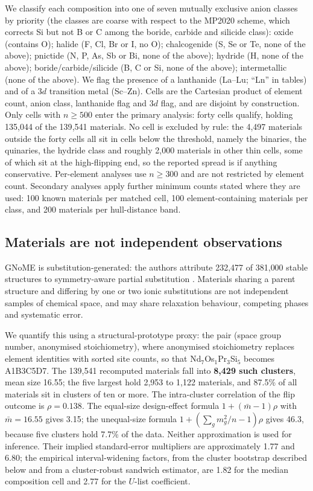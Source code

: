 \documentclass[11pt]{article}
\begin{document}
We classify each composition into one of seven mutually exclusive anion classes by
priority (the classes are coarse with respect to the MP2020 scheme, which corrects Si
but not B or C among the boride, carbide and silicide class): oxide (contains O); halide (F, Cl, Br or I, no O); chalcogenide (S, Se or Te,
none of the above); pnictide (N, P, As, Sb or Bi, none of the above); hydride (H, none of
the above); boride/carbide/silicide (B, C or Si, none of the above); intermetallic (none
of the above). We flag the presence of a lanthanide (La--Lu; ``Ln'' in tables) and of a
3$d$ transition metal (Sc--Zn). Cells are the Cartesian product of element count, anion class, lanthanide
flag and 3$d$ flag, and are disjoint by construction. Only cells with $n \ge 500$ enter
the primary analysis: forty cells qualify, holding 135{,}044 of the 139{,}541 materials.
No cell is excluded by rule: the 4{,}497 materials outside the forty cells all sit in
cells below the threshold, namely the binaries, the quinaries, the hydride class and roughly
2{,}000 materials in other thin cells, some of which sit at the high-flipping end, so
the reported spread is if anything conservative. Per-element analyses use $n \ge 300$ and are not restricted
by element count. Secondary analyses apply further minimum counts stated where they are
used: 100 known materials per matched cell, 100 element-containing materials per class,
and 200 materials per hull-distance band.

\subsection{Materials are not independent observations}\label{sec:cluster}

GNoME is substitution-generated: the authors attribute 232{,}477 of 381{,}000 stable
structures to symmetry-aware partial substitution \citep{merchant2023}. Materials sharing
a parent structure and differing by one or two ionic substitutions are not independent
samples of chemical space, and may share relaxation behaviour, competing phases and
systematic error.

We quantify this using a structural-prototype proxy: the pair (space group number,
anonymised stoichiometry), where anonymised stoichiometry replaces element identities with
sorted site counts, so that Nd$_7$Os$_1$Pr$_3$Si$_5$ becomes A1B3C5D7. The 139{,}541
recomputed materials fall into \textbf{8{,}429 such clusters}, mean size 16.55; the five
largest hold 2{,}953 to 1{,}122 materials, and 87.5\% of all materials sit in clusters of
ten or more. The intra-cluster correlation of the flip outcome is $\rho = 0.138$. The
equal-size design-effect formula $1 + (\bar m - 1)\rho$ with $\bar m = 16.55$ gives 3.15;
the unequal-size formula $1 + (\sum_g m_g^2/n - 1)\rho$ gives 46.3, because five clusters
hold 7.7\% of the data. Neither approximation is used for
inference. Their implied standard-error multipliers are approximately 1.77 and 6.80;
the empirical interval-widening factors, from the cluster bootstrap described below and
from a cluster-robust sandwich estimator, are 1.82 for the median composition cell and
2.77 for the $U$-list coefficient.
\end{document}
